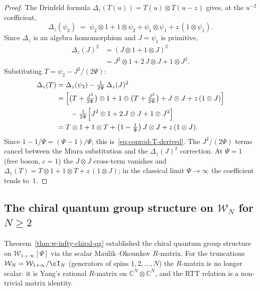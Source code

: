 \documentclass[11pt,reqno]{amsart}
\theoremstyle{definition}
\theoremstyle{remark}
\newcommand{\cW}{\mathcal{W}}
\newcommand{\CC}{\mathbb{C}}
\numberwithin{equation}{section}
\begin{document}
\begin{proof}
The Drinfeld formula
$\Delta_z(T(u)) = T(u) \otimes T(u-z)$
gives, at the $u^{-2}$ coefficient,
\[
  \Delta_z(\psi_2)
  \;=\;
  \psi_2 \otimes 1
  + 1 \otimes \psi_2
  + \psi_1 \otimes \psi_1
  + z\,(1 \otimes \psi_1).
\]
Since $\Delta_z$ is an algebra homomorphism and
$J = \psi_1$ is primitive,
\begin{align*}
  \Delta_z(J)^2
  &= (J \otimes 1 + 1 \otimes J)^2 \\
  &= J^2 \otimes 1
  + 2\,J \otimes J
  + 1 \otimes J^2.
\end{align*}
Substituting $T = \psi_2 - J^2/(2\Psi)$:
\begin{align*}
  \Delta_z(T)
  &= \Delta_z(\psi_2)
  - \tfrac{1}{2\Psi}\,\Delta_z(J)^2 \\
  &= \Bigl[
    \bigl(T + \tfrac{J^2}{2\Psi}\bigr) \otimes 1
    + 1 \otimes \bigl(T + \tfrac{J^2}{2\Psi}\bigr)
    + J \otimes J
    + z\,(1 \otimes J)
  \Bigr] \\
  &\qquad
  - \tfrac{1}{2\Psi}\Bigl[
    J^2 \otimes 1
    + 2\,J \otimes J
    + 1 \otimes J^2
  \Bigr] \\
  &= T \otimes 1
  + 1 \otimes T
  + \bigl(1 - \tfrac{1}{\Psi}\bigr)\,
  J \otimes J
  + z\,(1 \otimes J).
\end{align*}
Since $1 - 1/\Psi = (\Psi - 1)/\Psi$, this
is~\eqref{eq:coprod-T-derived}. The
$J^2/(2\Psi)$ terms cancel between the Miura
substitution and the $\Delta_z(J)^2$ correction.
At $\Psi = 1$ (free boson, $c = 1$) the
$J \otimes J$ cross-term vanishes and
$\Delta_z(T) = T \otimes 1 + 1 \otimes T
+ z\,(1 \otimes J)$;
in the classical limit $\Psi \to \infty$ the
coefficient tends to~$1$.
\end{proof}


\subsection{The chiral quantum group structure on
$\cW_N$ for $N \geq 2$}
\label{subsec:glN-chiral-qg}

Theorem~\ref{thm:w-infty-chiral-qg} established the chiral
quantum group structure on $\cW_{1+\infty}[\Psi]$ via the
scalar Maulik--Okounkov $R$-matrix. For the truncations
$\cW_N = \cW_{1+\infty}/\cI_N$ (generators of spins
$1, 2, \ldots, N$) the $R$-matrix is no longer scalar: it
is Yang's rational $R$-matrix on $\CC^N \otimes \CC^N$,
and the RTT relation is a non-trivial matrix identity.
\end{document}
